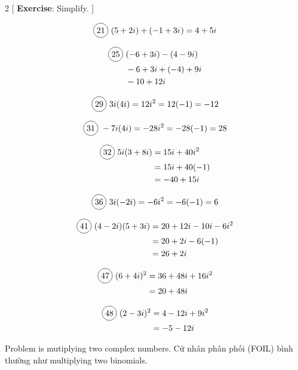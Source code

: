 \begin{multicols}{2}
[
  \textbf{Exercise}: Simplify.
]

\begin{align*}
  \circled{21}\ (5+2i)+(-1+3\iu)=4+5i
\end{align*}

  \begin{align*}
    \circled{25}\ &(-6+3i)-(4-9i)\\
    &-6+3i+(-4)+9i\\
    &-10 +12i
  \end{align*}

  \[\circled{29}\ 3i(4i)=12i^{2}=12(-1)=-12\]

  \[\circled{31}\ -7i(4i)=-28i^{2}=-28(-1)=28\]

  \begin{align*}
    \circled{32}\ 5i(3+8i)&=15i+40i^{2}\\
    &=15i+40(-1)\\
    &=-40+15i
  \end{align*}

  \[\circled{36}\ 3i(-2i)=-6i^{2}=-6(-1)=6\]

  \begin{align*}
    \circled{41}\ (4-2i)(5+3i)&=20+12i-10i-6i^{2}\\
    &=20+2i-6(-1)\\
    &=26+2i
  \end{align*}

  \begin{align*}
    \circled{47}\ (6+4i)^{2}&=36+48i+16i^{2}\\
    &=20+48i\\
  \end{align*}

  \begin{align*}
    \circled{48}\ (2-3i)^{2}&=4-12i+9i^{2}\\
    &=-5-12i\\
  \end{align*}
\end{multicols}

Problem  is mutiplying two complex numbers. Cứ nhân phân phối (FOIL) bình thường như multiplying two binomials.
